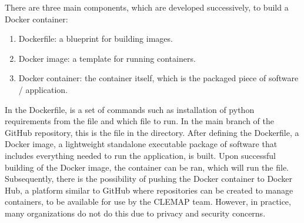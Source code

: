There are three main components, which are developed successively, to build a Docker container:

\begin{enumerate}
    \item Dockerfile: a blueprint for building images.
    \item Docker image: a template for running containers.
    \item Docker container: the container itself, which is the packaged piece of software / application.
\end{enumerate}

In the Dockerfile, is a set of commands such as installation of python requirements from the  file and which file to run. In the main branch of the GitHub repository, this is the  file in the  directory. After defining the Dockerfile, a Docker image, a lightweight standalone executable package of software that includes everything needed to run the application, is built. Upon successful building of the Docker image, the container can be ran, which will run the  file. Subsequently, there is the possibility of pushing the Docker container to Docker Hub, a platform similar to GitHub where repositories can be created to manage containers, to be available for use by the CLEMAP team. However, in practice, many organizations do not do this due to privacy and security concerns.